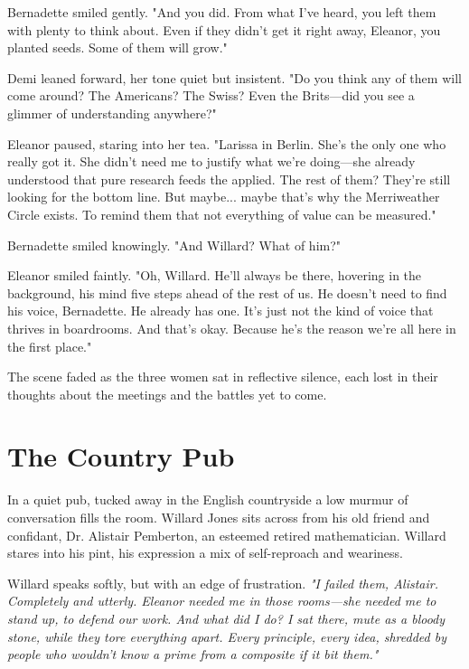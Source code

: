 Bernadette smiled gently. "And you did. From what I’ve heard, you left them with plenty to think about. Even if they didn’t get it right away, Eleanor, you planted seeds. Some of them will grow."
\smallskip

Demi leaned forward, her tone quiet but insistent. "Do you think any of them will come around? The Americans? The Swiss? Even the Brits—did you see a glimmer of understanding anywhere?"
\smallskip

Eleanor paused, staring into her tea. "Larissa in Berlin. She’s the only one who really got it. She didn’t need me to justify what we’re doing—she already understood that pure research feeds the applied. The rest of them? They’re still looking for the bottom line. But maybe... maybe that’s why the Merriweather Circle exists. To remind them that not everything of value can be measured."
\smallskip

Bernadette smiled knowingly. "And Willard? What of him?"
\smallskip

Eleanor smiled faintly. "Oh, Willard. He’ll always be there, hovering in the background, his mind five steps ahead of the rest of us. He doesn’t need to find his voice, Bernadette. He already has one. It’s just not the kind of voice that thrives in boardrooms. And that’s okay. Because he’s the reason we’re all here in the first place."

\smallskip

The scene faded as the three women sat in reflective silence, each lost in their thoughts about the meetings and the battles yet to come.


\newpage
\section*{The Country Pub}

\smallskip

In a quiet pub, tucked away in the English countryside a low murmur of conversation fills the room. Willard Jones sits across from his old friend and confidant, Dr. Alistair Pemberton, an esteemed retired mathematician. Willard stares into his pint, his expression a mix of self-reproach and weariness.

\smallskip

Willard speaks softly, but with an edge of frustration.  
\textit{"I failed them, Alistair. Completely and utterly. Eleanor needed me in those rooms—she needed me to stand up, to defend our work. And what did I do? I sat there, mute as a bloody stone, while they tore everything apart. Every principle, every idea, shredded by people who wouldn’t know a prime from a composite if it bit them."}
\smallskip

